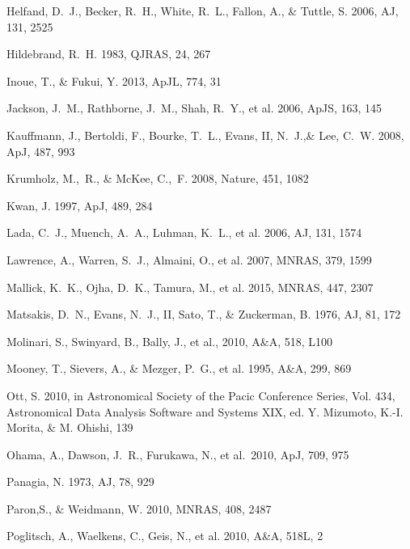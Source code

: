 \documentclass[iop]{emulateapj}
\begin{document}
\begin{thebibliography}{}
Helfand, D.~J., Becker, R.~H., White, R.~L., Fallon, A., \& Tuttle, S. 2006, AJ, 131, 2525 

Hildebrand, R.~H. 1983, QJRAS, 24, 267

Inoue, T., \& Fukui, Y. 2013, ApJL, 774, 31

Jackson, J.~M., Rathborne, J.~M., Shah, R.~Y., et al. 2006, ApJS, 163, 145

Kauffmann, J., Bertoldi, F., Bourke, T.~L., Evans, II, N.~J.,\&  Lee, C.~W. 2008, ApJ, 487, 993

Krumholz, M.,~R., \& McKee, C.,~F. 2008, Nature, 451, 1082

Kwan, J. 1997, ApJ, 489, 284

Lada, C.~J., Muench, A.~A., Luhman, K.~L., et al. 2006, AJ, 131, 1574

Lawrence, A., Warren, S.~J., Almaini, O., et al. 2007, MNRAS, 379, 1599

Mallick, K.~K., Ojha, D.~K., Tamura, M., et al. 2015, MNRAS, 447, 2307

Matsakis, D.~N., Evans, N.~J., II, Sato, T., \& Zuckerman, B. 1976, AJ, 81, 172

Molinari, S., Swinyard, B., Bally, J., et al., 2010, A\&A, 518, L100

Mooney, T., Sievers, A., \& Mezger, P.~G., et al. 1995, A\&A, 299, 869

Ott, S. 2010, in Astronomical Society of the Pacic Conference
Series, Vol. 434, Astronomical Data Analysis Software and
Systems XIX, ed. Y. Mizumoto, K.-I. Morita, \& M. Ohishi, 139

Ohama, A., Dawson, J.~R., Furukawa, N., et al.\ 2010, ApJ, 709, 975 

Panagia, N. 1973, AJ, 78, 929 

Paron,S., \& Weidmann, W. 2010, MNRAS, 408, 2487

Poglitsch, A., Waelkens, C., Geis, N., et al. 2010, A\&A, 518L, 2


\end{thebibliography}
\end{document}

